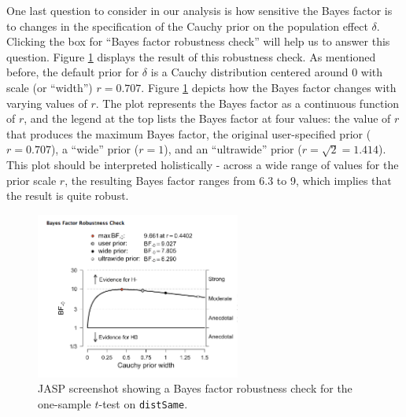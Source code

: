 \documentclass[english,,doc,floatsintext]{apa6}
\begin{document}
One last question to consider in our analysis is how sensitive the Bayes factor is to changes in the specification of the Cauchy prior on the population effect \(\delta\). Clicking the box for \enquote{Bayes factor robustness check} will help us to answer this question. Figure \ref{fig:ttestRobust} displays the result of this robustness check. As mentioned before, the default prior for \(\delta\) is a Cauchy distribution centered around \(0\) with scale (or \enquote{width}) \(r=0.707\). Figure \ref{fig:ttestRobust} depicts how the Bayes factor changes with varying values of \(r\). The plot represents the Bayes factor as a continuous function of \(r\), and the legend at the top lists the Bayes factor at four values: the value of \(r\) that produces the maximum Bayes factor, the original user-specified prior (\(r=0.707\)), a \enquote{wide} prior (\(r=1\)), and an \enquote{ultrawide} prior (\(r=\sqrt{2}=1.414\)). This plot should be interpreted holistically - across a wide range of values for the prior scale \(r\), the resulting Bayes factor ranges from 6.3 to 9, which implies that the result is quite robust.

\begin{figure}
\centering
\includegraphics[width=0.6\textwidth,height=\textheight]{figures/ttestRobust.png}
\caption{\label{fig:ttestRobust}JASP screenshot showing a Bayes factor robustness check for the one-sample \(t\)-test on \texttt{distSame}.}
\end{figure}
\end{document}
